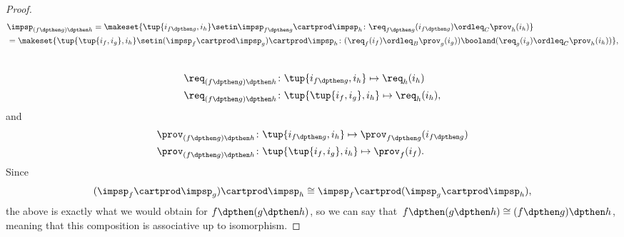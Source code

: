 {\begin{proof}
\begin{equation}
\begin{aligned}
                 & \impsp_{(f\dpthen g)\dpthen h} = \makeset{
                    \tup{i_{f\dpthen g},i_h} \setin \impsp_{f\dpthen g} \cartprod \impsp_{h}\colon
                    \req_{f\dpthen g}(i_{f\dpthen g}) \ordleq_{C} \prov_h(i_h)
                } \\
                 & =\makeset{
                    \tup{\tup{i_f, i_g},i_h} \setin (\impsp_f \cartprod \impsp_g) \cartprod \impsp_{h}\colon
                    (\req_f(i_f) \ordleq_{B} \prov_g(i_g))
                    \booland
                    (\req_g(i_g) \ordleq_{C} \prov_h(i_h))
                },
            \end{aligned}
        \end{equation}
        ~
        \begin{equation}
            \begin{aligned}
                \req_{(f\dpthen g)\dpthen h} & \colon  \tup{i_{f\dpthen g},i_h} \mapsto \req_h(i_h) \\
                \req_{(f\dpthen g)\dpthen h} & \colon  \tup{\tup{i_f, i_g},i_h} \mapsto \req_h(i_h),
            \end{aligned}
        \end{equation}
        and
        \begin{equation}
            \begin{aligned}
                \prov_{(f\dpthen g)\dpthen h} & \colon  \tup{i_{f\dpthen g},i_h} \mapsto \prov_{f\dpthen g}(i_{f\dpthen g}) \\
                \prov_{(f\dpthen g)\dpthen h} & \colon  \tup{\tup{i_f, i_g},i_h} \mapsto \prov_f(i_f).
            \end{aligned}
        \end{equation}
        Since
        \begin{equation}
            (\impsp_f \cartprod \impsp_g)
            \cartprod \impsp_{h} \cong  \impsp_f \cartprod (\impsp_g \cartprod \impsp_{h}),
        \end{equation}
        the above is exactly what we would obtain for $f\dpthen (g\dpthen h)$, so we can say that~$f\dpthen(g\dpthen h)\cong (f\dpthen g)\dpthen h$, meaning that this composition is associative up to isomorphism.
    \end{proof}

}
